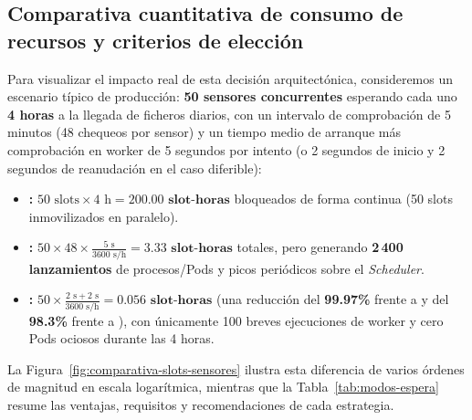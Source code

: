 \subsection{Comparativa cuantitativa de consumo de recursos y criterios de elección}

Para visualizar el impacto real de esta decisión arquitectónica, consideremos un escenario típico de producción: \textbf{50 sensores concurrentes} esperando cada uno \textbf{4 horas} a la llegada de ficheros diarios, con un intervalo de comprobación de 5 minutos (48 chequeos por sensor) y un tiempo medio de arranque más comprobación en worker de 5 segundos por intento (o 2 segundos de inicio y 2 segundos de reanudación en el caso diferible):

\begin{itemize}
  \item \textbf{:} $50 \text{ slots} \times 4\text{ h} = \mathbf{200.00\text{ slot-horas}}$ bloqueados de forma continua (50 slots inmovilizados en paralelo).
  \item \textbf{:} $50 \times 48 \times \frac{5\text{ s}}{3600\text{ s/h}} = \mathbf{3.33\text{ slot-horas}}$ totales, pero generando \textbf{2\,400 lanzamientos} de procesos/Pods y picos periódicos sobre el \textit{Scheduler}.
  \item \textbf{:} $50 \times \frac{2\text{ s} + 2\text{ s}}{3600\text{ s/h}} = \mathbf{0.056\text{ slot-horas}}$ (una reducción del \textbf{99.97\%} frente a  y del \textbf{98.3\%} frente a ), con únicamente 100 breves ejecuciones de worker y cero Pods ociosos durante las 4 horas.
\end{itemize}

La Figura~\ref{fig:comparativa-slots-sensores} ilustra esta diferencia de varios órdenes de magnitud en escala logarítmica, mientras que la Tabla~\ref{tab:modos-espera} resume las ventajas, requisitos y recomendaciones de cada estrategia.

